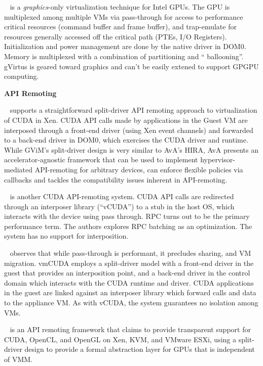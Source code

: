~\cite{tian2014full} is a \emph{graphics}-only
virtualization technique for Intel GPUs. The GPU is multiplexed among multiple
VMs via pass-through for access to performance critical resources (command
buffer and frame buffer), and trap-emulate for resources generally accessed
off the critical path (PTEs, I/O Registers). Initialization and power
management are done by the native driver in DOM0. Memory is multiplexed with a
combination of partitioning and `` ballooning''. gVirtus is geared toward
graphics and can't be easily extened to support GPGPU computing.

{\noindent \bf \large API Remoting}

~\cite{gupta2009gvim} supports a straightforward
split-driver API remoting approach to virtualization of CUDA in Xen.
CUDA API calls made by applications in the Guest VM are interposed through a
front-end driver (using Xen event channels) and forwarded to a back-end driver
in DOM0, which exercises the CUDA driver and runtime. While GViM's
split-driver design is very similar to AvA's HIRA, AvA presents an
accelerator-agnostic framework that can be used to implement
hypervisor-mediated API-remoting for arbitrary devices, can enforce flexible
policies via callbacks and tackles the compatibility issues inherent in
API-remoting.

~\cite{vCUDA} is another CUDA API-remoting system.
CUDA API calls are redirected through an interposer library (``vCUDA'') to a
stub in the host OS, which interacts with the device using pass through. RPC
turns out to be the primary performance term. The authors explores RPC
batching as an optimization. The system has no support for interposition.

~\cite{vmCUDA} observes that while pass-through is
performant, it precludes sharing, and VM migration.
vmCUDA employs a split-driver model with a front-end driver in the guest that
provides an interposition point, and a back-end driver in the control domain
which interacts with the CUDA runtime and driver. CUDA applications in the
guest are linked against an interposer library which forward calls and data to
the appliance VM. As with vCUDA, the system guarantees no isolation among VMs.

~\cite{gVirtuS} is an API remoting framework that claims
to provide transparent support for CUDA, OpenCL, and OpenGL on Xen, KVM, and
VMware ESXi, using a split-driver design to provide a formal abstraction layer
for GPUs that is independent of VMM.

